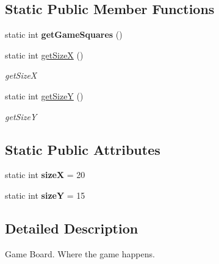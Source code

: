\subsection*{Static Public Member Functions}
\begin{DoxyCompactItemize}
\item 
\hypertarget{class_g___gameboard_acc15032c8c1fa2ca6a4f11868c706f2d}{}static int {\bfseries get\+Game\+Squares} ()\label{class_g___gameboard_acc15032c8c1fa2ca6a4f11868c706f2d}

\item 
static int \hyperlink{class_g___gameboard_a07ce76215f7d0d6cd0ae9a429cd7aab5}{get\+Size\+X} ()
\begin{DoxyCompactList}\small\item\em get\+Size\+X \end{DoxyCompactList}\item 
static int \hyperlink{class_g___gameboard_af3d38cd9763eb3c9aedf66bf7f2349c3}{get\+Size\+Y} ()
\begin{DoxyCompactList}\small\item\em get\+Size\+Y \end{DoxyCompactList}\end{DoxyCompactItemize}
\subsection*{Static Public Attributes}
\begin{DoxyCompactItemize}
\item 
\hypertarget{class_g___gameboard_a644c952f7db83b7aa1e0b084ad3016f1}{}static int {\bfseries size\+X} = 20\label{class_g___gameboard_a644c952f7db83b7aa1e0b084ad3016f1}

\item 
\hypertarget{class_g___gameboard_a5a02f201d4fa9e4012b68bd1415abd51}{}static int {\bfseries size\+Y} = 15\label{class_g___gameboard_a5a02f201d4fa9e4012b68bd1415abd51}

\end{DoxyCompactItemize}


\subsection{Detailed Description}
Game Board. Where the game happens. 

